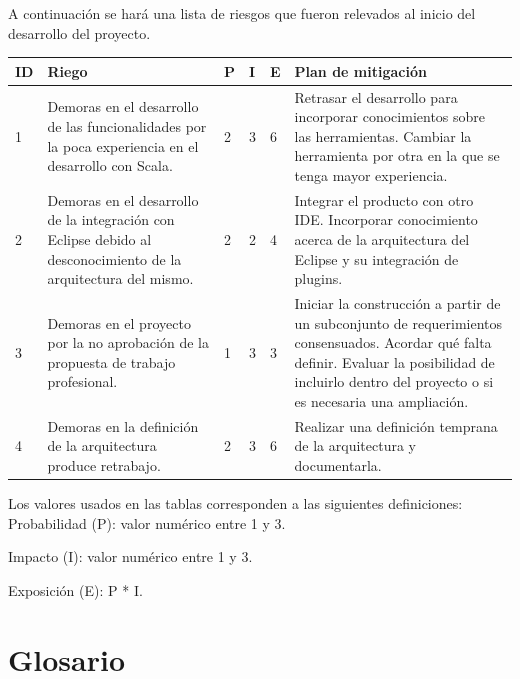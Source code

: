 \documentclass[12pt,a4paper]{article}
\begin{document}
A continuación se hará una lista de riesgos que fueron relevados al inicio del desarrollo del proyecto.

\begin{center}
    \begin{tabular}{ | l | p{5cm} | l | l | l | p{5cm} |}
    \hline
    ID & Riego & P & I & E & Plan de mitigación \\ \hline

	1 & Demoras en el desarrollo de las funcionalidades por la poca experiencia en el desarrollo con Scala.
	& 2 & 3 & 6 &
	Retrasar el desarrollo para incorporar conocimientos sobre las herramientas.
	Cambiar la herramienta por otra en la que se tenga mayor experiencia. \\ \hline

	2 & Demoras en el desarrollo de la integración con Eclipse debido al desconocimiento de la arquitectura del mismo.
	& 2 & 2 & 4 &
	Integrar el producto con otro IDE. Incorporar conocimiento acerca de la arquitectura del Eclipse y su integración de plugins. \\ \hline

	3 & Demoras en el proyecto por la no aprobación de la propuesta de trabajo profesional.
	& 1 & 3 & 3 &
	Iniciar la construcción a partir de un subconjunto de requerimientos consensuados. Acordar qué falta definir. Evaluar la posibilidad de incluirlo dentro del proyecto o si es necesaria una ampliación. \\ \hline

	4 & Demoras en la definición de la arquitectura produce retrabajo.
	& 2 & 3 & 6 &
	Realizar una definición temprana de la arquitectura y documentarla. \\ \hline
    \end{tabular}
\end{center}

Los valores usados en las tablas corresponden a las siguientes definiciones: \\

Probabilidad (P): valor numérico entre 1 y 3.

Impacto (I): valor numérico entre 1 y 3.

Exposición (E): P * I.

\newpage
	\section{Glosario}
\end{document}

